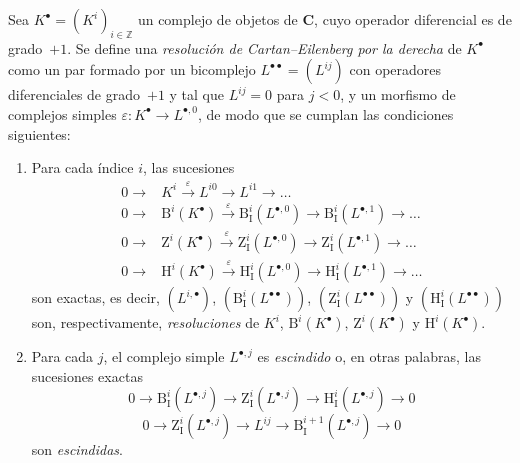 \begin{env}[11.4.2]
\label{0.11.4.2}
\label{0.11.4.2-fr}
Sea $K^\bullet=(K^i)_{i\in\mathbb Z}$ un complejo de objetos de $\boldsymbol{C}$, cuyo operador diferencial es de grado~$+1$.
Se define una \emph{resolución de Cartan--Eilenberg por la derecha} de $K^\bullet$ como un par formado por un bicomplejo $L^{\bullet\bullet}=(L^{ij})$ con operadores diferenciales de grado~$+1$ y tal que $L^{ij}=0$ para $j<0$, y un morfismo de complejos simples $\varepsilon:K^\bullet\to L^{\bullet,0}$, de modo que se cumplan las condiciones siguientes:
\begin{enumerate}
  \item[(i)] Para cada índice $i$, las sucesiones
    \[
    \begin{aligned}
      0\longrightarrow{}&K^i\xrightarrow{\varepsilon}L^{i0}
        \longrightarrow L^{i1}\longrightarrow\ldots\\
      0\longrightarrow{}&\mathrm B^i(K^\bullet)\xrightarrow{\varepsilon}
        \mathrm B_{\mathrm I}^i(L^{\bullet,0})
        \longrightarrow\mathrm B_{\mathrm I}^i(L^{\bullet,1})
        \longrightarrow\ldots\\
      0\longrightarrow{}&\mathrm Z^i(K^\bullet)\xrightarrow{\varepsilon}
        \mathrm Z_{\mathrm I}^i(L^{\bullet,0})
        \longrightarrow\mathrm Z_{\mathrm I}^i(L^{\bullet,1})
        \longrightarrow\ldots\\
      0\longrightarrow{}&\mathrm H^i(K^\bullet)\xrightarrow{\varepsilon}
        \mathrm H_{\mathrm I}^i(L^{\bullet,0})
        \longrightarrow\mathrm H_{\mathrm I}^i(L^{\bullet,1})
        \longrightarrow\ldots
    \end{aligned}
    \]
    son exactas, es decir, $(L^{i,\bullet})$, $(\mathrm B_{\mathrm I}^i(L^{\bullet\bullet}))$, $(\mathrm Z_{\mathrm I}^i(L^{\bullet\bullet}))$ y
$(\mathrm H_{\mathrm I}^i(L^{\bullet\bullet}))$ son, respectivamente, \emph{resoluciones} de $K^i$, $\mathrm B^i(K^\bullet)$, $\mathrm Z^i(K^\bullet)$ y $\mathrm H^i(K^\bullet)$.
  \item[(ii)] Para cada $j$, el complejo simple $L^{\bullet,j}$ es \emph{escindido} o, en otras palabras, las sucesiones exactas
    \[
      \label{0.11.4.2.1-fr}
      0\longrightarrow\mathrm B_{\mathrm I}^i(L^{\bullet,j})
      \longrightarrow\mathrm Z_{\mathrm I}^i(L^{\bullet,j})
      \longrightarrow\mathrm H_{\mathrm I}^i(L^{\bullet,j})
      \longrightarrow0
      \tag{11.4.2.1}
    \]
    \[
      \label{0.11.4.2.2-fr}
      0\longrightarrow\mathrm Z_{\mathrm I}^i(L^{\bullet,j})
      \longrightarrow L^{ij}
      \longrightarrow\mathrm B_{\mathrm I}^{i+1}(L^{\bullet,j})
      \longrightarrow0
      \tag{11.4.2.2}
    \]
    son \emph{escindidas}.
\end{enumerate}


\end{env}
